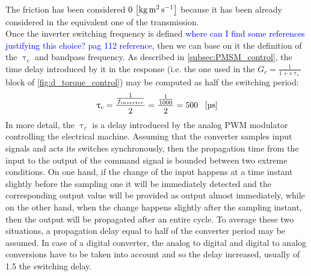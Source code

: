 The friction has been considered $ 0 \, \left[\si{\kilo\gram\square\meter\per\second}\right]$ because it has been already considered in the equivalent one of the transmission. \\
 Once the inverter switching frequency is defined \textcolor{blue}{where can I find some references justifying this choice? pag 112 reference}, then we can base on it the definition of the $\uptau_c$ and bandpass frequency. As described in \autoref{subsec:PMSM_control}, the time delay introduced by it in the response (i.e. the one used in the $G_c=\frac{1}{1+s\uptau_c}$ block of \autoref{fig:d_torque_control}) may be computed as half the switching period:
 \begin{gather}
 \uptau_{c}=\frac{\frac{1}{f_{inverter}}}{2}=\frac{\frac{1}{1000}}{2}=500 \ \ \left[\si{\micro \second}\right]
 \end{gather}
 In more detail, the $\uptau_c$ is a delay introduced by the analog PWM modulator controlling the electrical machine. Assuming that the converter samples input signals and acts its switches synchronously, then the propagation time from the input to the output of the command signal is bounded between two extreme conditions. On one hand, if the change of the input happens at a time instant slightly before the sampling one it will be immediately detected and the corresponding output value will be provided as output almost immediately, while on the other hand, when the change happens slightly after the sampling instant, then the output will be propagated after an entire cycle. To average these two situations, a propagation delay equal to half of the converter period may be assumed. In case of a digital converter, the analog to digital and digital to analog conversions have to be taken into account and so the delay increased, usually of 1.5 the switching delay.
 
